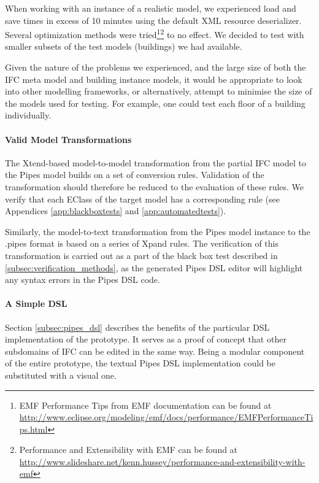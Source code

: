 When working with an instance of a realistic model, we experienced load and save times in excess of 10 minutes using the default XML resource deserializer. Several optimization methods were tried\footnote{EMF Performance Tips from EMF documentation can be found at \url{http://www.eclipse.org/modeling/emf/docs/performance/EMFPerformanceTips.html}}\footnote{Performance and Extensibility with EMF can be found at \url{http://www.slideshare.net/kenn.hussey/performance-and-extensibility-with-emf}} to no effect. We decided to test with smaller subsets of the test models (buildings) we had available.

Given the nature of the problems we experienced, and the large size of both the IFC meta model and building instance models, it would be appropriate to look into other modelling frameworks, or alternatively, attempt to minimise the size of the models used for testing. For example, one could test each floor of a building individually.

\paragraph{Valid Model Transformations} The Xtend-based model-to-model transformation from the partial IFC model to the Pipes model builds on a set of conversion rules. Validation of the transformation should therefore be reduced to the evaluation of these rules. We verify that each EClass of the target model has a corresponding rule (see Appendices \ref{app:blackboxtests} and \ref{app:automatedtests}).

Similarly, the model-to-text transformation from the Pipes model instance to the .pipes format is based on a series of Xpand rules. The verification of this transformation is carried out as a part of the black box test described in \ref{subsec:verification_methods}, as the generated Pipes DSL editor will highlight any syntax errors in the Pipes DSL code.

\paragraph{A Simple DSL} Section \ref{subsec:pipes_dsl} describes the benefits of the particular DSL implementation of the prototype. It serves as a proof of concept that other subdomains of IFC can be edited in the same way. Being a modular component of the entire prototype, the textual Pipes DSL implementation could be substituted with a visual one.

